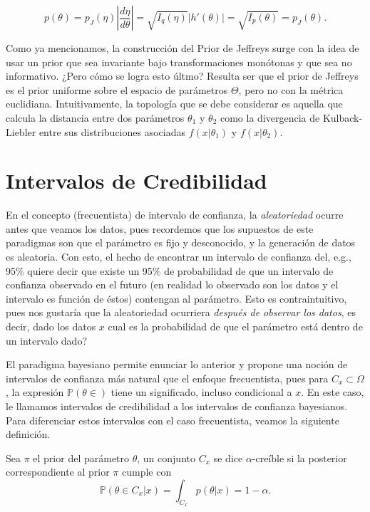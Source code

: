 \begin{equation}
	p(\theta) = p_J(\eta) \left|\frac{d \eta}{d \theta}\right| = \sqrt{I_q(\eta)}\left|h'(\theta)\right| = \sqrt{I_p(\theta)} = p_J(\theta).
\end{equation}

Como ya mencionamos, la construcción del Prior de Jeffreys surge con la idea de usar un prior que sea invariante bajo transformaciones monótonas y que sea no informativo. ¿Pero cómo se logra esto últmo? Resulta ser que el prior de Jeffreys es el prior uniforme sobre el espacio de parámetros $\Theta$, pero no con la métrica euclidiana. Intuitivamente, la topología que se debe considerar es aquella que calcula la distancia entre dos parámetros $\theta_1$ y $\theta_2$ como la divergencia de Kulback-Liebler entre sus distribuciones asociadas $f(x|\theta_1)$ y $f(x|\theta_2)$.

\section{Intervalos de Credibilidad}

En el concepto (frecuentista) de intervalo de confianza, la  \emph{aleatoriedad} ocurre antes que veamos los datos, pues recordemos que los supuestos de este paradigmas son que el parámetro es fijo y desconocido, y la generación de datos es aleatoria. Con esto, el hecho de encontrar un intervalo de confianza del, e.g., 95\% quiere decir que existe un 95\% de probabilidad de que un intervalo de confianza observado en el futuro (en realidad lo observado son los datos y el intervalo es función de éstos) contengan al parámetro. Esto es contraintuitivo, pues nos gustaría que la {aleatoriedad} ocurriera \emph{después de observar los datos}, es decir, dado los datos $x$ cual es la probabilidad de que el parámetro está dentro de un intervalo dado?

El paradigma bayesiano permite enunciar lo anterior y propone una noción de intervalos de confianza más natural que el enfoque frecuentista, pues para $ C_x\subset \Omega$, la expresión $\mathbb{P}(\theta \in)$ tiene un significado, incluso condicional a $x$. En este caso, le llamamos intervalos de credibilidad a los intervalos de confianza bayesianos. Para diferenciar estos intervalos con el caso frecuentista, veamos la siguiente definición. 

\begin{definition}
Sea $\pi$ el prior del parámetro $\theta$, un conjunto $C_x$ se dice  $\alpha$-creíble si la posterior correspondiente al prior $\pi$ cumple con 
$$
\mathbb{P}(\theta \in C_x |x) = \int_{C_x}p(\theta |x) = 1- \alpha.
$$
\end{definition}

